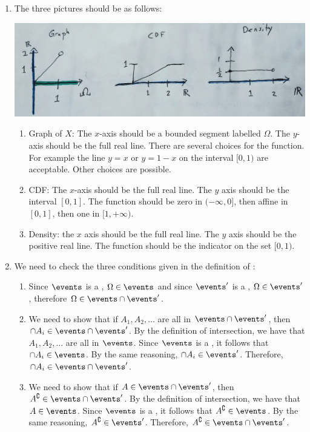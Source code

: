 \documentclass{article}
\begin{document}
\begin{enumerate}
  \item The three pictures should be as follows:
\begin{center}
	\includegraphics[width=0.9\linewidth]{figures/3-viz}
\end{center}
  \begin{enumerate}
    \item Graph of $X$: The $x$-axis should be a bounded segment labelled $\Omega$. The $y$-axis should be the full real line. There are several choices for the function. For example the line $y = x$ or $y = 1 - x$ on the interval $[0, 1)$ are acceptable. Other choices are possible.
    \item CDF: The $x$-axis should be the full real line. The $y$ axis should be the interval $[0, 1]$. The function should be zero in $(-\infty, 0]$, then affine in $[0, 1]$, then one in $[1, +\infty)$.
    \item Density: the $x$ axis should be the full real line. The $y$ axis should be the positive real line. The function should be the indicator on the set $[0, 1)$.
  \end{enumerate}
  \item We need to check the three conditions given in the definition of \sigmaalg:
  \begin{enumerate}
    \item Since $\events$ is a \sigmaalg, $\Omega \in \events$ and since $\events'$ is a \sigmaalg, $\Omega \in \events'$, therefore $\Omega \in \events \cap \events'$.
    \item We need to show that if $A_1, A_2, \dots$ are all in $\events \cap \events'$, then $\cap A_i \in \events \cap \events'$. By the definition of intersection, we have that $A_1, A_2, \dots$ are all in $\events$. Since $\events$ is a \sigmaalg, it follows that $\cap A_i \in \events$. By the same reasoning, $\cap A_i \in \events'$. Therefore, $\cap A_i \in \events \cap \events'$.
    \item We need to show that if $A \in \events \cap \events'$, then $A^\complement \in \events \cap \events'$. By the definition of intersection, we have that $A \in \events$. Since $\events$ is a \sigmaalg, it follows that $A^\complement \in \events$. By the same reasoning, $A^\complement \in \events'$. Therefore, $A^\complement \in \events \cap \events'$.

\end{enumerate}
\end{enumerate}
\end{document}
